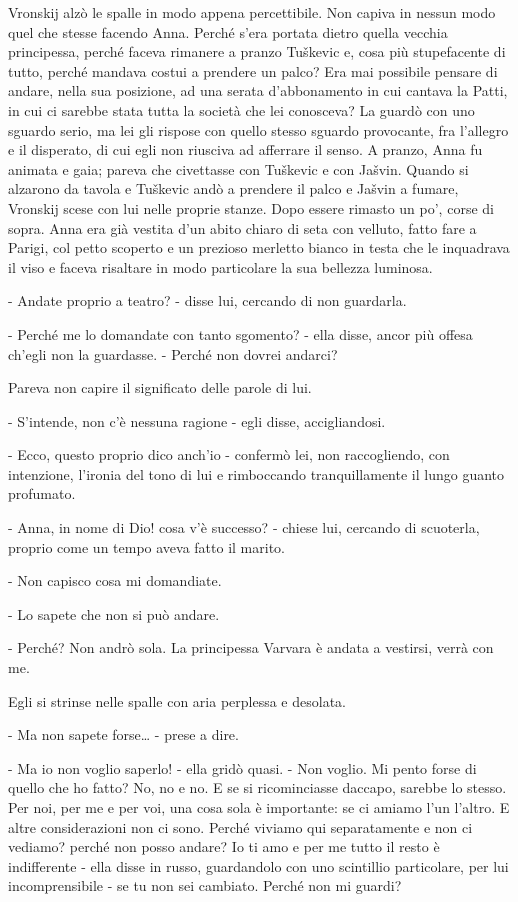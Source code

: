 Vronskij alzò le spalle in modo appena percettibile. Non capiva in nessun modo quel che stesse facendo Anna. Perché s'era portata dietro quella vecchia principessa, perché faceva rimanere a pranzo Tuškevic e, cosa più stupefacente di tutto, perché mandava costui a prendere un palco? Era mai possibile pensare di andare, nella sua posizione, ad una serata d'abbonamento in cui cantava la Patti, in cui ci sarebbe stata tutta la società che lei conosceva? La guardò con uno sguardo serio, ma lei gli rispose con quello stesso sguardo provocante, fra l'allegro e il disperato, di cui egli non riusciva ad afferrare il senso. A pranzo, Anna fu animata e gaia; pareva che civettasse con Tuškevic e con Jašvin. Quando si alzarono da tavola e Tuškevic andò a prendere il palco e Jašvin a fumare, Vronskij scese con lui nelle proprie stanze. Dopo essere rimasto un po', corse di sopra. Anna era già vestita d'un abito chiaro di seta con velluto, fatto fare a Parigi, col petto scoperto e un prezioso merletto bianco in testa che le inquadrava il viso e faceva risaltare in modo particolare la sua bellezza luminosa. 

- Andate proprio a teatro? - disse lui, cercando di non guardarla. 

- Perché me lo domandate con tanto sgomento? - ella disse, ancor più offesa ch'egli non la guardasse. - Perché non dovrei andarci? 

Pareva non capire il significato delle parole di lui. 

- S'intende, non c'è nessuna ragione - egli disse, accigliandosi. 

- Ecco, questo proprio dico anch'io - confermò lei, non raccogliendo, con intenzione, l'ironia del tono di lui e rimboccando tranquillamente il lungo guanto profumato. 

- Anna, in nome di Dio! cosa v'è successo? - chiese lui, cercando di scuoterla, proprio come un tempo aveva fatto il marito. 

- Non capisco cosa mi domandiate. 

- Lo sapete che non si può andare. 

- Perché? Non andrò sola. La principessa Varvara è andata a vestirsi, verrà con me. 

Egli si strinse nelle spalle con aria perplessa e desolata. 

- Ma non sapete forse\ldots{} - prese a dire. 

- Ma io non voglio saperlo! - ella gridò quasi. - Non voglio. Mi pento forse di quello che ho fatto? No, no e no. E se si ricominciasse daccapo, sarebbe lo stesso. Per noi, per me e per voi, una cosa sola è importante: se ci amiamo l'un l'altro. E altre considerazioni non ci sono. Perché viviamo qui separatamente e non ci vediamo? perché non posso andare? Io ti amo e per me tutto il resto è indifferente - ella disse in russo, guardandolo con uno scintillio particolare, per lui incomprensibile - se tu non sei cambiato. Perché non mi guardi? 

